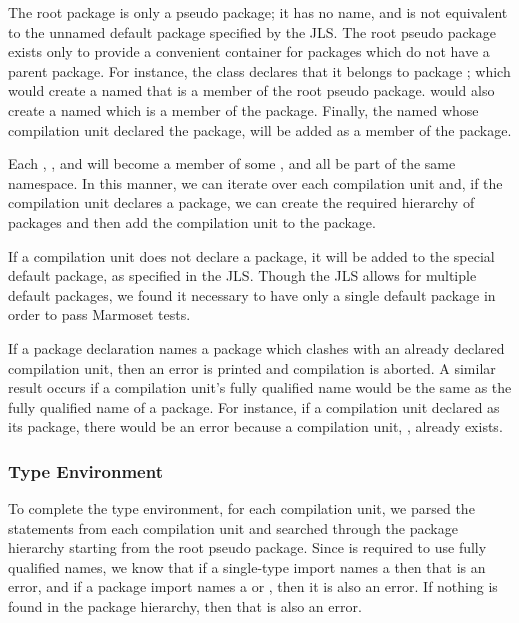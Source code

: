 \documentclass[pdftex,11pt,a4paper]{article}
\begin{document}
The root package is only a pseudo package; it has no name, and is not
equivalent to the unnamed default package specified by the JLS. The
root pseudo package exists only to provide a convenient container for
packages which do not have a parent package. For instance,
the  class declares that it belongs to package
; which would create a  named 
that is a member of the root pseudo package. 
would also create a  named  which is a member
of the  package. Finally, the  named
 whose compilation unit declared the package, will be
added as a member of the  package.

Each , , and  will become a
member of some , and all be part of the same namespace.
In this manner, we can iterate over each compilation unit
and, if the compilation unit declares a package, we can create the
required hierarchy of packages and then add the compilation unit to
the package.

If a compilation unit does not declare a package, it will be added to
the special default package, as specified in the JLS. Though the JLS
allows for multiple default packages, we found it necessary to have
only a single default package in order to pass Marmoset tests.

If a package declaration names a package which clashes with an already
declared compilation unit, then an error is printed and compilation is
aborted. A similar result occurs if a compilation unit's fully
qualified name would be the same as the fully qualified name of a
package. For instance, if a compilation unit declared
 as its package, there would be an
error because a compilation unit, ,
already exists.

\subsubsection{Type Environment}

To complete the type environment, for each compilation unit, we parsed
the  statements from each compilation unit and searched
through the package hierarchy starting from the root pseudo
package. Since  is required to use fully qualified names,
we know that if a single-type import names a  then that
is an error, and if a package import names a  or
, then it is also an error. If nothing is found in the
package hierarchy, then that is also an error.
\end{document}

